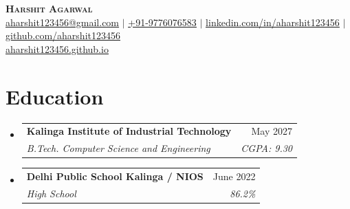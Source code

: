 \documentclass[letterpaper,11pt]{article}
\makeatletter
\newcommand{\resumeSubheading}[4]{
  \vspace{-2pt}\item
    \begin{tabular*}{0.97\textwidth}[t]{l@{\extracolsep{\fill}}r}
      \textbf{#1} & #2 \\
      \textit{\small#3} & \textit{\small #4} \\
    \end{tabular*}
}
\newcommand{\resumeSubHeadingListStart}{\begin{itemize}[leftmargin=0.15in, label={}]}
\newcommand{\resumeSubHeadingListEnd}{\end{itemize}\vspace{-5pt}}
\makeatother
\begin{document}
\begin{center}
    \textbf{\Huge \scshape Harshit Agarwal} \\ \vspace{3pt}
    \small
    \href{mailto:aharshit123456@gmail.com}{\underline{aharshit123456@gmail.com}} $|$ 
    \href{tel:+919776076583}{\underline{+91-9776076583}} $|$ 
    \href{https://www.linkedin.com/in/aharshit123456/}{\underline{linkedin.com/in/aharshit123456}} $|$
    \href{https://github.com/aharshit123456}{\underline{github.com/aharshit123456}} \\ \vspace{2pt}
    \small
    \href{https://aharshit123456.github.io}{\underline{aharshit123456.github.io}}
\end{center}



\section{Education}
  \resumeSubHeadingListStart
    \resumeSubheading
      {Kalinga Institute of Industrial Technology}{May 2027}
      {B.Tech. Computer Science and Engineering}{CGPA: 9.30}
    \resumeSubheading
      {Delhi Public School Kalinga / NIOS}{June 2022}
      {High School}{86.2\%}
  \resumeSubHeadingListEnd

\vspace{-18pt}
\end{document}
